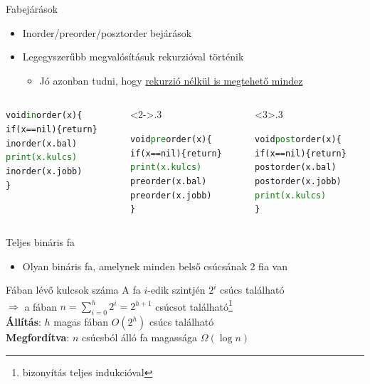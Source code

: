 \documentclass{beamer}
\begin{document}
\begin{frame}[fragile]{Fabejárások}
	\begin{itemize}
		\item Inorder/preorder/posztorder bejárások
		\item Legegyszerűbb megvalósításuk rekurzióval történik
		\begin{itemize}
			\item Jó azonban tudni, hogy  \href{https://sites.google.com/site/debforit/efficient-binary-tree-traversal-with-two-pointers}{rekurzió nélkül is megtehető mindez}
		\end{itemize}
	\end{itemize}
	\begin{columns}
		\begin{column}{.3\linewidth}
\begin{alltt}
\small
void \textcolor{green}{in}order(x)\{
  if(x==nil)\{return\}
  inorder(x.bal)
  \textcolor{green}{print(x.kulcs)}
  inorder(x.jobb)
\}
\end{alltt}
		\end{column}
		\begin{column}<2->{.3\linewidth}
\begin{alltt}
\small
void \textcolor{green}{pre}order(x)\{
  if(x==nil)\{return\}
  \textcolor{green}{print(x.kulcs)}
  preorder(x.bal)
  preorder(x.jobb)
\}
\end{alltt}
		\end{column}
		\begin{column}<3>{.3\linewidth}
\begin{alltt}
\small
void \textcolor{green}{post}order(x)\{
  if(x==nil)\{return\}
  postorder(x.bal)
  postorder(x.jobb)
  \textcolor{green}{print(x.kulcs)}
\}
\end{alltt}
		\end{column}
	\end{columns}
\end{frame}

\begin{frame}{Teljes bináris fa}
	\begin{itemize}
		\item Olyan bináris fa, amelynek minden belső csúcsának 2 fia van
	\end{itemize}
	\begin{block}{Fában lévő kulcsok száma}
		A fa $i$-edik szintjén $2^i$ csúcs található \\ \pause $\Rightarrow$ a fában $n=\sum\limits_{i=0}^{h} 2^i=2^{h+1}$ csúcsot található\footnote{bizonyítás teljes indukcióval} \\
		\textbf{Állítás}: $h$ magas fában $O(2^h)$ csúcs található \\ \pause
		\textbf{Megfordítva}: $n$ csúcsból álló fa magassága $\Omega(\log n)$
	\end{block}
\end{frame}
\end{document}
